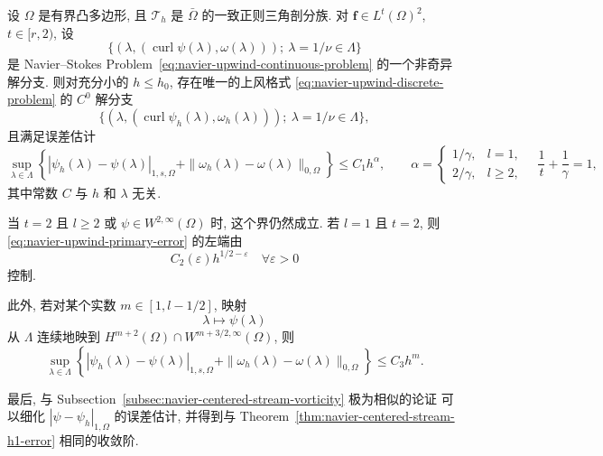 \setcounter{statement}{0}
\begin{Theorem}\label{thm:navier-upwind-branch-error}
设 $\Omega$ 是有界凸多边形, 且 $\mathcal T_h$ 是 $\bar\Omega$ 的一致正则三角剖分族.
对 $\boldsymbol f\in L^t(\Omega)^2$, $t\in[r,2)$, 设
\[
\{(\lambda,(\operatorname{curl}\psi(\lambda),\omega(\lambda)));
\ \lambda=1/\nu\in\Lambda\}
\]
是 Navier--Stokes Problem~\eqref{eq:navier-upwind-continuous-problem}
的一个非奇异解分支. 则对充分小的 $h\leq h_0$, 存在唯一的上风格式
\eqref{eq:navier-upwind-discrete-problem} 的 $C^0$ 解分支
\[
\{(\lambda,(\operatorname{curl}\psi_h(\lambda),\omega_h(\lambda)));
\ \lambda=1/\nu\in\Lambda\},
\]
且满足误差估计
\begin{equation}\label{eq:navier-upwind-primary-error}
\sup_{\lambda\in\Lambda}\left\{
|\psi_h(\lambda)-\psi(\lambda)|_{1,s,\Omega}
+\|\omega_h(\lambda)-\omega(\lambda)\|_{0,\Omega}
\right\}
\leq C_1h^\alpha,
\qquad
\alpha=\begin{cases}
1/\gamma,&l=1,\\
2/\gamma,&l\geq2,
\end{cases}
\quad \frac1t+\frac1\gamma=1,
\end{equation}
其中常数 $C$ 与 $h$ 和 $\lambda$ 无关.
\end{Theorem}

当 $t=2$ 且 $l\geq2$ 或 $\psi\in W^{2,\infty}(\Omega)$ 时, 这个界仍然成立.
若 $l=1$ 且 $t=2$, 则 \eqref{eq:navier-upwind-primary-error} 的左端由
\[
C_2(\varepsilon)h^{1/2-\varepsilon}
\quad\forall\varepsilon>0
\]
控制.

此外, 若对某个实数 $m\in[1,l-1/2]$, 映射
\[
\lambda\mapsto\psi(\lambda)
\]
从 $\Lambda$ 连续地映到
$H^{m+2}(\Omega)\cap W^{m+3/2,\infty}(\Omega)$, 则
\begin{equation}\label{eq:navier-upwind-higher-regularity-error}
\sup_{\lambda\in\Lambda}\left\{
|\psi_h(\lambda)-\psi(\lambda)|_{1,s,\Omega}
+\|\omega_h(\lambda)-\omega(\lambda)\|_{0,\Omega}
\right\}
\leq C_3h^m.
\end{equation}

最后, 与 Subsection~\ref{subsec:navier-centered-stream-vorticity} 极为相似的论证
可以细化 $|\psi-\psi_h|_{1,\Omega}$ 的误差估计, 并得到与
Theorem~\ref{thm:navier-centered-stream-h1-error} 相同的收敛阶.

